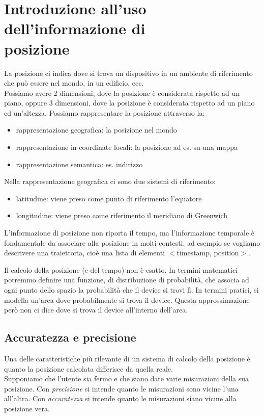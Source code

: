 \section[Introduzione all'uso dell'informazione di posizione]{Introduzione all'uso dell'informazione di \\posizione}
La posizione ci indica dove si trova un dispositivo in un ambiente di riferimento che può essere nel mondo, in un edificio, ecc. 
\\ Possiamo avere 2 dimensioni, dove la posizione è considerata rispetto ad un piano, oppure 3 dimensioni, dove la posizione è considerata rispetto ad un piano ed un'altezza.
Possiamo rappresentare la posizione attraverso la:
\begin{itemize}
    \item rappresentazione geografica: la posizione nel mondo 
    \item rappresentazione in coordinate locali: la posizione ad es. su una mappa 
    \item rappresentazione semantica: es. indirizzo
\end{itemize}

Nella rappresentazione geografica ci sono due sistemi di riferimento: 
\begin{itemize}
    \item latitudine: viene preso come punto di riferimento l'equatore 
    \item longitudine: viene preso come riferimento il meridiano di Greenwich 
\end{itemize}

L’informazione di posizione non riporta il tempo, ma l'informazione temporale è fondamentale da associare alla posizione in molti contesti, ad esempio se vogliamo descrivere una traiettoria, cioè una lista di elementi $<$timestamp, position$>$. 

Il calcolo della posizione (e del tempo) non è esatto. 
In termini matematici potremmo definire una funzione, di distribuzione di probabilità, che associa ad ogni punto dello spazio la probabilità che il device si trovi lì. 
In termini pratici, si modella un'area dove probabilmente si trova il device. 
Questa approssimazione però non ci dice dove si trova il device all'interno dell'area. 

\subsection{Accuratezza e precisione}
Una delle caratteristiche più rilevante di un sistema di calcolo della posizione è quanto la posizione calcolata differisce da quella reale. 
\\ Supponiamo che l’utente sia fermo e che siano date varie misurazioni della sua posizione.
Con \textit{precisione} si intende quanto le misurazioni sono vicine l'una all'altra.
Con \textit{accuratezza} si intende quanto le misurazioni siano vicine alla posizione vera.

